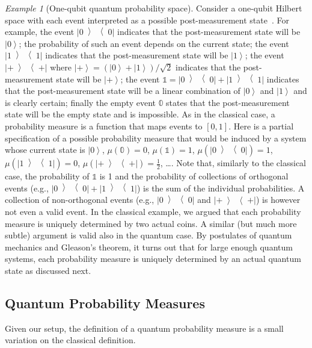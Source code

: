 \documentclass[12pt]{iopart}
\theoremstyle{remark}
\newtheorem{example}{Example}
\newcommand{\ket}[1]{{\left\vert{#1}\right\rangle}}
\newcommand{\op}[2]{\ensuremath{\left\vert{#1}\middle\rangle\middle\langle{#2}\right\vert}}
\newcommand{\proj}[1]{\op{#1}{#1}}
\newcommand{\ps}{\texttt{+}}
\begin{document}
\begin{example}[One-qubit quantum probability space] Consider a
  one-qubit Hilbert space with each event interpreted as a possible
  post-measurement state~\cite{peres1995quantum,Mermin2007,Jaeger2007}. 
  For example, the event $\proj{0}$ indicates
  that the post-measurement state will be $\ket{0}$; the probability
  of such an event depends on the current state; the event $\proj{1}$
  indicates that the post-measurement state will be $\ket{1}$; the
  event $\proj{\ps}$ where
  $\ket{\ps}=\left(\ket{0}+\ket{1}\right) / \sqrt{2}$ indicates that the
  post-measurement state will be $\ket{\ps}$; the event
  $\mathbb{1}=\proj{0}+\proj{1}$ indicates that the post-measurement
  state will be a linear combination of $\ket{0}$ and $\ket{1}$ and is
  clearly certain; finally the empty event $\mathbb{0}$ states that
  the post-measurement state will be the empty state and is
  impossible. As in the classical case, a probability measure is a
  function that maps events to $[0,1]$. Here is a partial
  specification of a possible probability measure that would be
  induced by a system whose current state is $\ket{0}$,
  $\mu\left(\mathbb{0}\right)=0$, $\mu\left(\mathbb{1}\right)=1$,
  $\mu\left(\proj{0}\right)=1$, $\mu\left(\proj{1}\right)=0$,
  $\mu\left(\proj{\ps}\right)=\frac{1}{2}$, \ldots. Note that, similarly to
  the classical case, the probability of $\mathbb{1}$ is 1 and the
  probability of collections of orthogonal events (e.g.,
  $\proj{0}+\proj{1}$) is the sum of the individual probabilities.  A
  collection of non-orthogonal events (e.g., $\proj{0}$ and
  $\proj{\ps}$) is however not even a valid event. In the classical
  example, we argued that each probability measure is uniquely
  determined by two actual coins. A similar (but much more subtle)
  argument is valid also in the quantum case. By postulates of quantum
  mechanics and Gleason's theorem, it turns out that for large enough
  quantum systems, each probability measure is uniquely determined by
  an actual quantum state as discussed next.
\end{example}

\subsection{Quantum Probability Measures}

Given our setup, the definition of a quantum probability measure is a
small variation on the classical definition. 
\end{document}
